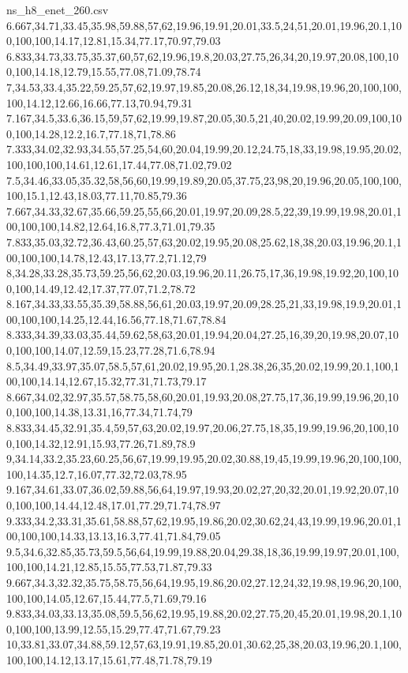 \begin{filecontents*}[overwrite]{ns_h8_enet_260.csv}
6.667,34.71,33.45,35.98,59.88,57,62,19.96,19.91,20.01,33.5,24,51,20.01,19.96,20.1,100,100,100,14.17,12.81,15.34,77.17,70.97,79.03
6.833,34.73,33.75,35.37,60,57,62,19.96,19.8,20.03,27.75,26,34,20,19.97,20.08,100,100,100,14.18,12.79,15.55,77.08,71.09,78.74
7,34.53,33.4,35.22,59.25,57,62,19.97,19.85,20.08,26.12,18,34,19.98,19.96,20,100,100,100,14.12,12.66,16.66,77.13,70.94,79.31
7.167,34.5,33.6,36.15,59,57,62,19.99,19.87,20.05,30.5,21,40,20.02,19.99,20.09,100,100,100,14.28,12.2,16.7,77.18,71,78.86
7.333,34.02,32.93,34.55,57.25,54,60,20.04,19.99,20.12,24.75,18,33,19.98,19.95,20.02,100,100,100,14.61,12.61,17.44,77.08,71.02,79.02
7.5,34.46,33.05,35.32,58,56,60,19.99,19.89,20.05,37.75,23,98,20,19.96,20.05,100,100,100,15.1,12.43,18.03,77.11,70.85,79.36
7.667,34.33,32.67,35.66,59.25,55,66,20.01,19.97,20.09,28.5,22,39,19.99,19.98,20.01,100,100,100,14.82,12.64,16.8,77.3,71.01,79.35
7.833,35.03,32.72,36.43,60.25,57,63,20.02,19.95,20.08,25.62,18,38,20.03,19.96,20.1,100,100,100,14.78,12.43,17.13,77.2,71.12,79
8,34.28,33.28,35.73,59.25,56,62,20.03,19.96,20.11,26.75,17,36,19.98,19.92,20,100,100,100,14.49,12.42,17.37,77.07,71.2,78.72
8.167,34.33,33.55,35.39,58.88,56,61,20.03,19.97,20.09,28.25,21,33,19.98,19.9,20.01,100,100,100,14.25,12.44,16.56,77.18,71.67,78.84
8.333,34.39,33.03,35.44,59.62,58,63,20.01,19.94,20.04,27.25,16,39,20,19.98,20.07,100,100,100,14.07,12.59,15.23,77.28,71.6,78.94
8.5,34.49,33.97,35.07,58.5,57,61,20.02,19.95,20.1,28.38,26,35,20.02,19.99,20.1,100,100,100,14.14,12.67,15.32,77.31,71.73,79.17
8.667,34.02,32.97,35.57,58.75,58,60,20.01,19.93,20.08,27.75,17,36,19.99,19.96,20,100,100,100,14.38,13.31,16,77.34,71.74,79
8.833,34.45,32.91,35.4,59,57,63,20.02,19.97,20.06,27.75,18,35,19.99,19.96,20,100,100,100,14.32,12.91,15.93,77.26,71.89,78.9
9,34.14,33.2,35.23,60.25,56,67,19.99,19.95,20.02,30.88,19,45,19.99,19.96,20,100,100,100,14.35,12.7,16.07,77.32,72.03,78.95
9.167,34.61,33.07,36.02,59.88,56,64,19.97,19.93,20.02,27,20,32,20.01,19.92,20.07,100,100,100,14.44,12.48,17.01,77.29,71.74,78.97
9.333,34.2,33.31,35.61,58.88,57,62,19.95,19.86,20.02,30.62,24,43,19.99,19.96,20.01,100,100,100,14.33,13.13,16.3,77.41,71.84,79.05
9.5,34.6,32.85,35.73,59.5,56,64,19.99,19.88,20.04,29.38,18,36,19.99,19.97,20.01,100,100,100,14.21,12.85,15.55,77.53,71.87,79.33
9.667,34.3,32.32,35.75,58.75,56,64,19.95,19.86,20.02,27.12,24,32,19.98,19.96,20,100,100,100,14.05,12.67,15.44,77.5,71.69,79.16
9.833,34.03,33.13,35.08,59.5,56,62,19.95,19.88,20.02,27.75,20,45,20.01,19.98,20.1,100,100,100,13.99,12.55,15.29,77.47,71.67,79.23
10,33.81,33.07,34.88,59.12,57,63,19.91,19.85,20.01,30.62,25,38,20.03,19.96,20.1,100,100,100,14.12,13.17,15.61,77.48,71.78,79.19

\end{filecontents*}
